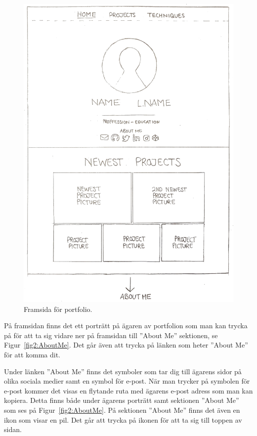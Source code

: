 \documentclass{TDP003mall}
\begin{document}
\begin{figure}[ht!]
  \centering
  \includegraphics[width=140mm]{1_home.jpg}
  \caption{Framsida för portfolio.} \label{fig1:Framsida}
\end{figure}

På framsidan finns det ett porträtt på ägaren av portfolion som man kan trycka på för att ta sig vidare ner på framsidan till ''About Me'' sektionen, se Figur~\ref{fig2:AboutMe}. Det går även att trycka på länken som heter ''About Me'' för att komma dit.

Under länken ''About Me'' finns det symboler som tar dig till ägarens sidor på olika sociala medier samt en symbol för e-post. När man trycker på symbolen för e-post kommer det visas en flytande ruta med ägarens e-post adress som man kan kopiera. Detta finns både under ägarens porträtt samt sektionen ''About Me'' som ses på Figur~\ref{fig2:AboutMe}. På sektionen ''About Me'' finns det även en ikon som visar en pil. Det går att trycka på ikonen för att ta sig till toppen av sidan.
\end{document}
